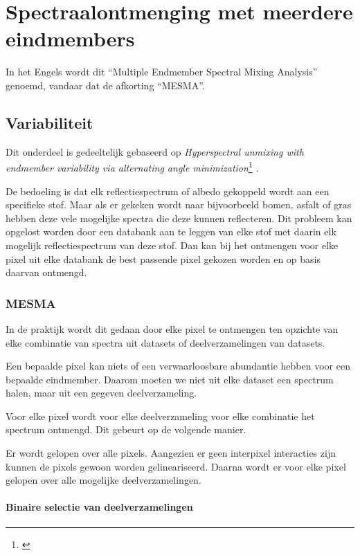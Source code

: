 \documentclass[12pt]{report}
\newcommand{\footcite}[1]{\cite{#1}\let\thefootnote\relax \footnote{\cite{#1} \bibentry{#1}} }
\begin{document}
\chapter{Spectraalontmenging met meerdere eindmembers}

In het Engels wordt dit ``Multiple Endmember Spectral Mixing Analysis'' genoemd, vandaar dat de afkorting ``MESMA''.

\section{Variabiliteit}

Dit onderdeel is gedeeltelijk gebaseerd op \textit{Hyperspectral unmixing with endmember variability
via alternating angle minimization}\footcite{mesma}.

De bedoeling is dat elk reflectiespectrum of albedo gekoppeld wordt aan een specifieke stof. Maar als er gekeken wordt naar bijvoorbeeld bomen, asfalt of gras hebben deze vele mogelijke spectra die deze kunnen reflecteren. Dit probleem kan opgelost worden door een databank aan te leggen van elke stof met daarin elk mogelijk reflectiespectrum van deze stof. Dan kan bij het ontmengen voor elke pixel uit elke databank de best passende pixel gekozen worden en op basis daarvan ontmengd. 

\subsection{MESMA}


In de praktijk wordt dit gedaan door elke pixel te ontmengen ten opzichte van elke combinatie van spectra uit datasets of deelverzamelingen van datasets.

Een bepaalde pixel kan niets of een verwaarloosbare abundantie hebben voor een bepaalde eindmember. Daarom moeten we niet uit elke dataset een spectrum halen, maar uit een gegeven deelverzameling.

Voor elke pixel wordt voor elke deelverzameling voor elke combinatie het spectrum ontmengd. Dit gebeurt op de volgende manier.


Er wordt gelopen over alle pixels. Aangezien er geen interpixel interacties zijn kunnen de pixels gewoon worden gelineariseerd. Daarna wordt er voor elke pixel gelopen over alle mogelijke deelverzamelingen. 
\subsubsection{Binaire selectie van deelverzamelingen}
\end{document}
